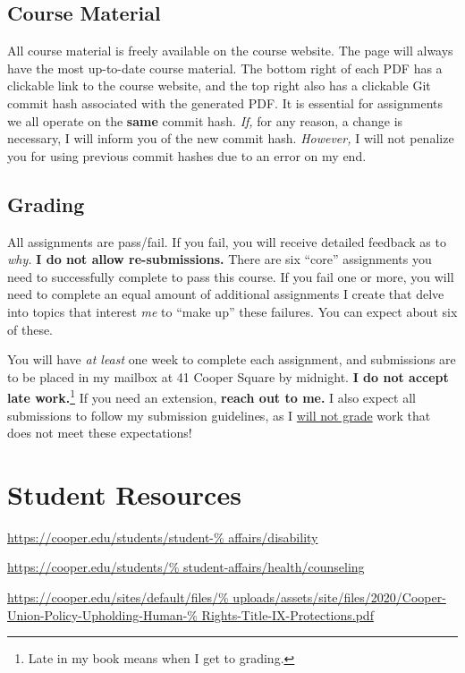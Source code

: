 \documentclass{article}
\begin{document}
\subsection{Course Material}

All course material is freely available on the course website.  The page
will always have the most up-to-date course material.  The bottom right
of each PDF has a clickable link to the course website, and the top
right also has a clickable Git commit hash associated with the generated
PDF.  It is essential for assignments we all operate on the \textbf{%
same} commit hash.  \emph{If,} for any reason, a change is necessary, I
will inform you of the new commit hash.  \emph{However,} I will not
penalize you for using previous commit hashes due to an error on my end.

\subsection{Grading}

All assignments are pass/fail.  If you fail, you will receive detailed
feedback as to \emph{why.}  \textbf{I do not allow re-submissions.}
There are six \enquote{core} assignments you need to successfully
complete to pass this course.  If you fail one or more, you will need to
complete an equal amount of additional assignments I create that delve
into topics that interest \emph{me} to \enquote{make up} these failures.
You can expect about six of these.

You will have \emph{at least} one week to complete each assignment, and
submissions are to be placed in my mailbox at 41 Cooper Square by
midnight.  \textbf{I do not accept late work.}\footnote{Late in my book
means when I get to grading.}  If you need an extension, \textbf{reach
out to me.}  I also expect all submissions to follow my submission
guidelines, as I \underline{will not grade} work that does
not meet these expectations!

\section{Student Resources}

 \url{https://cooper.edu/students/student-%
affairs/disability}

 \url{https://cooper.edu/students/%
student-affairs/health/counseling}

 \url{https://cooper.edu/sites/default/files/%
uploads/assets/site/files/2020/Cooper-Union-Policy-Upholding-Human-%
Rights-Title-IX-Protections.pdf}
\end{document}
